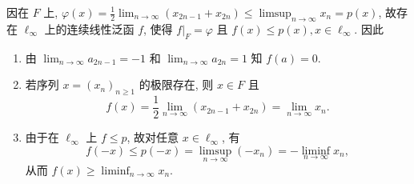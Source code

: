 \begin{enumerate}
\begin{answer}
      因在 $F$ 上, $\varphi(x)=\frac{1}{2}\lim_{n\to\infty}(x_{2n-1}+x_{2n})\leq\limsup_{n\to\infty}x_n=p(x)$,
      故存在 $\ell_{\infty}$ 上的连续线性泛函 $f$, 使得 $f|_F=\varphi$ 且 $f(x)\leq p(x),x\in\ell_{\infty}$. 因此

        \begin{enumerate}
          \item 由 $\lim_{n\to\infty}a_{2n-1}=-1$ 和 $\lim_{n\to\infty}a_{2n}=1$ 知 $f(a)=0$.

          \item 若序列 $x=(x_n)_{n\geq 1}$ 的极限存在, 则 $x\in F$ 且
          \[f(x)=\frac{1}{2}\lim_{n\to\infty}(x_{2n-1}+x_{2n})=\lim_{n\to\infty}x_n.\]
    
          \item 由于在 $\ell_{\infty}$ 上 $f\leq p$, 故对任意 $x\in\ell_{\infty}$, 有
          \[f(-x)\leq p(-x)=\limsup_{n\to\infty}(-x_n)=-\liminf_{n\to\infty}x_n,\]
          从而 $f(x)\geq\liminf_{n\to\infty}x_n$.
        \end{enumerate}
    \end{answer}
\end{enumerate}



